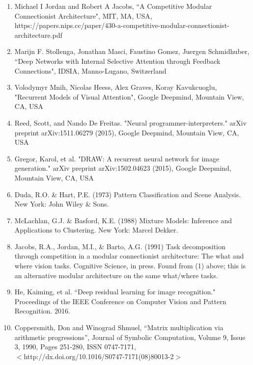\documentclass[12pt]{article}
\begin{document}


\begin{enumerate}
\item 	Michael I Jordan and Robert A Jacobs, ``A Competitive Modular Connectionist Architecture", MIT, MA, USA, https://papers.nips.cc/paper/430-a-competitive-modular-connectionist-architecture.pdf
\item 	Marijn F. Stollenga, Jonathan Masci, Faustino Gomez, Juergen Schmidhuber, ``Deep Networks with Internal Selective Attention through Feedback Connections", IDSIA, Manno-Lugano, Switzerland
\item 	Volodymyr Mnih, Nicolas Heess, Alex Graves, Koray Kavukcuoglu, "Recurrent Models of Visual Attention", Google Deepmind, Mountain View, CA, USA
\item	Reed, Scott, and Nando De Freitas. "Neural programmer-interpreters." arXiv preprint arXiv:1511.06279 (2015), Google Deepmind, Mountain View, CA, USA
\item	Gregor, Karol, et al. "DRAW: A recurrent neural network for image generation." arXiv preprint arXiv:1502.04623 (2015), Google Deepmind, Mountain View, CA, USA
	\item Duda, R.O. \& Hart, P.E. (1973) Pattern Classification and Scene Analysis. New York: John Wiley \& Sons. 
	\item McLachlan, G.J. \& Basford, K.E. (1988) Mixture Models: Inference and Applications to Clustering. New York: Marcel Dekker.
	\item Jacobs, R.A., Jordan, M.I., \& Barto, A.G. (1991) Task decomposition through competition in a modular connectionist architecture: The what and where vision tasks. Cognitive Science, in press.  Found from (1) above; this is an alternative modular architecture on the same what/where tasks.
	\item He, Kaiming, et al. ``Deep residual learning for image recognition." Proceedings of the IEEE Conference on Computer Vision and Pattern Recognition. 2016.
	\item Coppersmith, Don and Winograd Shmuel, ``Matrix multiplication via arithmetic progressions'', Journal of Symbolic Computation, Volume 9, Issue 3, 1990, Pages 251-280, ISSN 0747-7171, \\ $<$http://dx.doi.org/10.1016/S0747-7171(08)80013-2$>$
	\end{enumerate}
\end{document}
